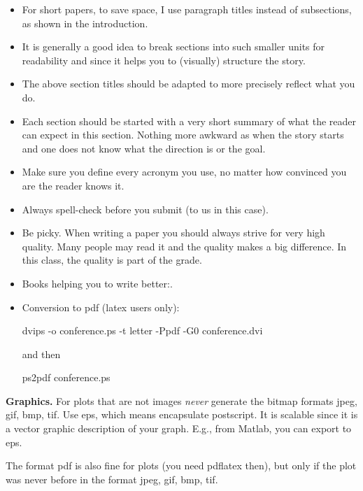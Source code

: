\documentclass[sigconf]{acmart}
\newcommand{\mypar}[1]{{\bf #1.}}
\begin{document}
\begin{itemize}
  \item For short papers, to save space, I use paragraph titles instead of subsections,
        as shown in the introduction.

  \item It is generally a good idea to break sections into such smaller units for
        readability and since it helps you to (visually) structure the story.

  \item The above section titles should be adapted to more precisely reflect what you
        do.

  \item Each section should be started with a very short summary of what the reader can
        expect in this section. Nothing more awkward as when the story starts and one
        does not know what the direction is or the goal.

  \item Make sure you define every acronym you use, no matter how convinced you are the
        reader knows it.

  \item Always spell-check before you submit (to us in this case).

  \item Be picky. When writing a paper you should always strive for very high quality.
        Many people may read it and the quality makes a big difference. In this class,
        the quality is part of the grade.

  \item Books helping you to write better:.

  \item Conversion to pdf (latex users only):

        dvips -o conference.ps -t letter -Ppdf -G0 conference.dvi

        and then

        ps2pdf conference.ps
\end{itemize}

\mypar{Graphics} For plots that are not images {\em never} generate the bitmap formats
jpeg, gif, bmp, tif. Use eps, which means encapsulate postscript. It is
scalable since it is a vector graphic description of your graph. E.g.,
from Matlab, you can export to eps.

The format pdf is also fine for plots (you need pdflatex then), but only if the
plot was never before in the format jpeg, gif, bmp, tif.
\end{document}
